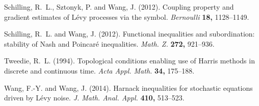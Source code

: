 \documentclass{aptpub}
\numberwithin{equation}{section}
\begin{document}
\begin{thebibliography}{99}
{\sc Schilling, R.~L., Sztonyk, P. and Wang, J.} (2012).
Coupling property and gradient estimates of L\'{e}vy processes via the symbol. {\em Bernoulli} {\bf 18,} 1128--1149.


{\sc Schilling, R.~L. and Wang, J.} (2012).
Functional inequalities and subordination: stability of Nash and Poincar\'{e} inequalities. {\em Math. Z.}
{\bf 272,} 921--936.


{\sc Tweedie, R.~L.} (1994).
Topological conditions enabling use of Harris methods in discrete and continuous time. {\em Acta Appl. Math.} {\bf 34,} 175--188.


{\sc Wang, F.-Y. and Wang, J.} (2014).
Harnack inequalities for stochastic equations driven by L\'evy noise.
{\em J. Math. Anal. Appl.} {\bf 410,} 513--523.


\end{thebibliography}
\end{document}
